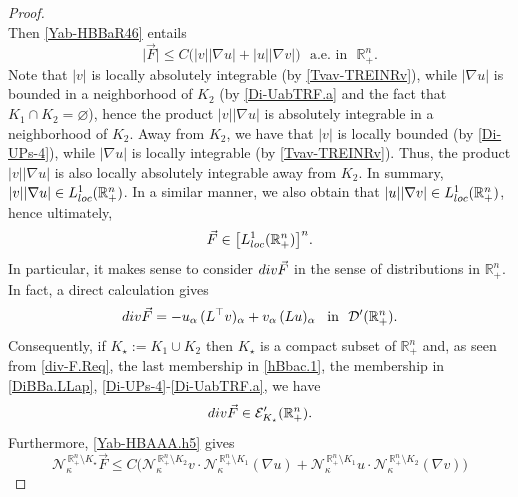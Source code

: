 \documentclass[10pt,a4paper]{amsart}
\begin{document}
\begin{proof}
\begin{equation}
\end{equation}
%
Then \eqref{Yab-HBBaR46} entails 
%
\begin{equation}\label{Yab-HBAAA.h5}
\big|\vec{F}\big|\leq C\big(|v||\nabla u|+|u|\big|\nabla v\big|\big)
\,\,\text{ a.e. in }\,\,{\mathbb{R}}^n_{+}.
\end{equation}
%
Note that $|v|$ is locally absolutely integrable (by \eqref{Tvav-TREINRv}), 
while $|\nabla u|$ is bounded in a neighborhood of $K_2$ (by \eqref{Di-UabTRF.a} 
and the fact that $K_1\cap K_2=\varnothing$), hence the product $|v||\nabla u|$ is 
absolutely integrable in a neighborhood of $K_2$. Away from $K_2$, we have that 
$|v|$ is locally bounded (by \eqref{Di-UPs-4}), while $|\nabla u|$ is locally 
integrable (by \eqref{Tvav-TREINRv}). Thus, the product $|v||\nabla u|$ is also 
locally absolutely integrable away from $K_2$. In summary, 
$|v||\nabla u|\in L^1_{\rm loc}({\mathbb{R}}^n_{+})$. In a similar manner, we also 
obtain that $|u||\nabla v|\in L^1_{\rm loc}({\mathbb{R}}^n_{+})$, 
hence ultimately, 
%
\begin{equation}\label{Yab-HBAAA.aF}
\vec{F}\in\big[L^1_{\rm loc}({\mathbb{R}}^n_{+})\big]^n.
\end{equation}
%
In particular, it makes sense to consider ${\rm div}\vec{F}$ in the sense of 
distributions in ${\mathbb{R}}^n_{+}$. In fact, a direct calculation gives
%
\begin{equation}\label{div-F.Req}
{\rm div}\vec{F}=-u_{\alpha}\,(L^{\top}v)_\alpha+v_{\alpha}\,(Lu)_\alpha
\,\,\,\text{ in }\,\,{\mathcal{D}}'({\mathbb{R}}^n_{+}).
\end{equation}
%
Consequently, if $K_\star:=K_1\cup K_2$ then $K_\star$ is a compact 
subset of ${\mathbb{R}}^n_{+}$ and, as seen from \eqref{div-F.Req}, the last membership in \eqref{hBbac.1},
the membership in \eqref{DiBBa.LLap}, \eqref{Di-UPs-4}-\eqref{Di-UabTRF.a}, we have
%
\begin{equation}\label{div-F.Req.3}
{\rm div}\vec{F}\in{\mathcal{E}}'_{K_\star}({\mathbb{R}}^n_{+}). 
\end{equation}
%
Furthermore, \eqref{Yab-HBAAA.h5} gives
%
\begin{equation}\label{Yab-HBna-TAn}
{\mathcal{N}}^{\,\mathbb{R}^{n}_{+}\setminus K_\star}_{\kappa}\vec{F}
\leq C\Big({\mathcal{N}}^{\,\mathbb{R}^{n}_{+}\setminus K_2}_{\kappa}v\cdot
{\mathcal{N}}^{\,\mathbb{R}^{n}_{+}\setminus K_1}_{\kappa}(\nabla u) 
+{\mathcal{N}}^{\,\mathbb{R}^{n}_{+}\setminus K_1}_{\kappa}u
\cdot{\mathcal{N}}^{\,\mathbb{R}^{n}_{+}\setminus K_2}_{\kappa}(\nabla v)\Big)

\end{equation}
\end{proof}
\end{document}

